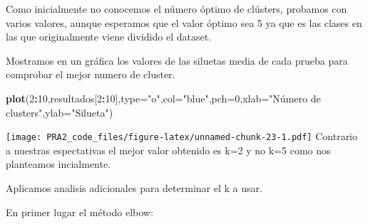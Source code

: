 \documentclass[
]{article}
\newenvironment{Shaded}{\begin{snugshade}}{\end{snugshade}}
\newcommand{\ControlFlowTok}[1]{\textcolor[rgb]{0.13,0.29,0.53}{\textbf{#1}}}
\newcommand{\DataTypeTok}[1]{\textcolor[rgb]{0.13,0.29,0.53}{#1}}
\newcommand{\DecValTok}[1]{\textcolor[rgb]{0.00,0.00,0.81}{#1}}
\newcommand{\KeywordTok}[1]{\textcolor[rgb]{0.13,0.29,0.53}{\textbf{#1}}}
\newcommand{\NormalTok}[1]{#1}
\newcommand{\OperatorTok}[1]{\textcolor[rgb]{0.81,0.36,0.00}{\textbf{#1}}}
\newcommand{\StringTok}[1]{\textcolor[rgb]{0.31,0.60,0.02}{#1}}
\begin{document}
Como inicialmente no conocemos el número óptimo de clústers, probamos
con varios valores, aunque esperamos que el valor óptimo sea 5 ya que es
las clases en las que originalmente viene dividido el dataset.

\begin{Shaded}
\end{Shaded}

Mostramos en un gráfica los valores de las siluetas media de cada prueba
para comprobar el mejor numero de cluster.

\begin{Shaded}
\begin{Highlighting}[]
\KeywordTok{plot}\NormalTok{(}\DecValTok{2}\OperatorTok{:}\DecValTok{10}\NormalTok{,resultados[}\DecValTok{2}\OperatorTok{:}\DecValTok{10}\NormalTok{],}\DataTypeTok{type=}\StringTok{"o"}\NormalTok{,}\DataTypeTok{col=}\StringTok{"blue"}\NormalTok{,}\DataTypeTok{pch=}\DecValTok{0}\NormalTok{,}\DataTypeTok{xlab=}\StringTok{"Número de clusters"}\NormalTok{,}\DataTypeTok{ylab=}\StringTok{"Silueta"}\NormalTok{)}
\end{Highlighting}
\end{Shaded}

\texttt{[image: PRA2\_code\_files/figure-latex/unnamed-chunk-23-1.pdf]}
Contrario a nuestras espectativas el mejor valor obtenido es k=2 y no
k=5 como nos planteamos incialmente.

Aplicamos analisis adicionales para determinar el k a usar.

En primer lugar el método elbow:
\end{document}
